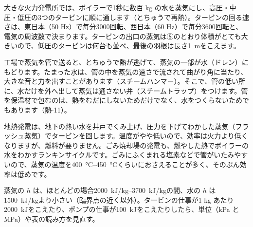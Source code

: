 \begin{phkougaku}[発電所と工場の蒸気]
大きな火力発電所では、ボイラーで1秒に数百 kg の水を蒸気にし、高圧・中圧・低圧の3つのタービンに順に通します（とちゅうで再熱）。タービンの回る速さは、東日本（50 Hz）で毎分3000回転、西日本（60 Hz）で毎分3600回転と、電気の周波数で決まります。タービンの出口の蒸気は⑤のとおり体積がとても大きいので、低圧のタービンは何台も並べ、最後の羽根は長さ\qty{1}{m}をこえます。

工場で蒸気を管で送ると、とちゅうで熱が逃げて、蒸気の一部が水（ドレン）にもどります。たまった水は、管の中を蒸気の速さで流されて曲がり角に当たり、大きな音と力を出すことがあります（スチームハンマー）。そこで、管の低い所に、水だけを外へ出して蒸気は通さない弁（スチームトラップ）をつけます。管を保温材で包むのは、熱をむだにしないためだけでなく、水をつくらないためでもあります（熱-11）。

地熱発電は、地下の熱い水を井戸でくみ上げ、圧力を下げてわかした蒸気（フラッシュ蒸気）でタービンを回します。温度がやや低いので、効率は火力より低くなりますが、燃料が要りません。ごみ焼却場の発電も、燃やした熱でボイラーの水をわかすランキンサイクルです。ごみにふくまれる塩素などで管がいたみやすいので、蒸気の温度を\qtyrange{400}{450}{\celsius}くらいにおさえることが多く、そのぶん効率は低めです。
\begin{phketa}[蒸気と発電所の数]
蒸気の $h$ は、ほとんどの場合\qtyrange{2000}{3700}{kJ/kg}の間、水の $h$ は\qty{1500}{kJ/kg}より小さい（臨界点の近く以外）。タービンの仕事が1 kg あたり\qty{2000}{kJ}をこえたり、ポンプの仕事が\qty{100}{kJ}をこえたりしたら、単位（kPa と MPa）や表の読み方を見直す。
\end{phketa}
\end{phkougaku}

